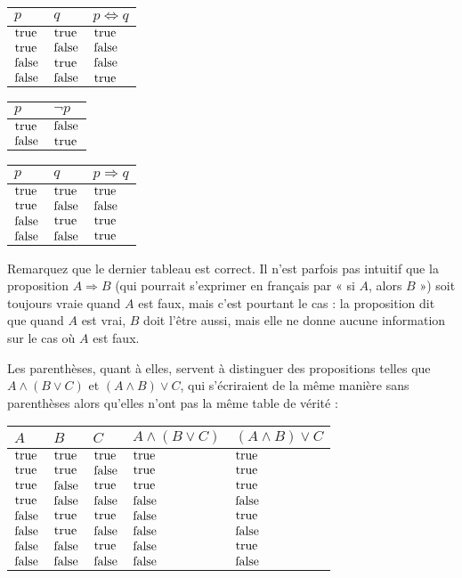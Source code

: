\begin{tabular}{ll|l}
  $p$ & $q$ & $p \Leftrightarrow q$ \\
  \hline

  $\mathrm{true}$ & $\mathrm{true}$ & $\mathrm{true}$ \\
  $\mathrm{true}$ & $\mathrm{false}$ & $\mathrm{false}$ \\
  $\mathrm{false}$ & $\mathrm{true}$ & $\mathrm{false}$ \\
  $\mathrm{false}$ & $\mathrm{false}$ & $\mathrm{true}$
\end{tabular}
\vspace{2 mm}

\begin{tabular}{l|l}
  $p$ & $\lnot p$ \\
  \hline

  $\mathrm{true}$ & $\mathrm{false}$ \\
  $\mathrm{false}$ & $\mathrm{true}$
\end{tabular}
\vspace{2 mm}

\begin{tabular}{ll|l}
  $p$ & $q$ & $p \Rightarrow q$ \\
  \hline

  $\mathrm{true}$ & $\mathrm{true}$ & $\mathrm{true}$ \\
  $\mathrm{true}$ & $\mathrm{false}$ & $\mathrm{false}$ \\
  $\mathrm{false}$ & $\mathrm{true}$ & $\mathrm{true}$ \\
  $\mathrm{false}$ & $\mathrm{false}$ & $\mathrm{true}$
\end{tabular}
\vspace{2 mm}

Remarquez que le dernier tableau est correct. Il n’est parfois pas intuitif
que la proposition $A \Rightarrow B$ (qui pourrait s’exprimer en français
par « si $A$, alors $B$ ») soit toujours vraie quand $A$ est faux, mais c’est
pourtant le cas : la proposition dit que quand $A$ est vrai, $B$ doit
l’être aussi, mais elle ne donne aucune information sur le cas où $A$ est
faux.

Les parenthèses, quant à elles, servent à distinguer des propositions telles
que $A \land (B \lor C)$ et $(A \land B) \lor C$, qui s’écriraient de la
même manière sans parenthèses alors qu’elles n’ont pas la même table de
vérité :

\begin{tabular}{lll|ll}
  $A$ & $B$ & $C$ & $A \land (B \lor C)$ & $(A \land B) \lor C$ \\
  \hline

  $\mathrm{true}$  & $\mathrm{true}$  & $\mathrm{true}$  & $\mathrm{true}$  & $\mathrm{true}$  \\
  $\mathrm{true}$  & $\mathrm{true}$  & $\mathrm{false}$ & $\mathrm{true}$  & $\mathrm{true}$  \\
  $\mathrm{true}$  & $\mathrm{false}$ & $\mathrm{true}$  & $\mathrm{true}$  & $\mathrm{true}$  \\
  $\mathrm{true}$  & $\mathrm{false}$ & $\mathrm{false}$ & $\mathrm{false}$ & $\mathrm{false}$ \\
  $\mathrm{false}$ & $\mathrm{true}$  & $\mathrm{true}$  & $\mathrm{false}$ & $\mathrm{true}$  \\
  $\mathrm{false}$ & $\mathrm{true}$  & $\mathrm{false}$ & $\mathrm{false}$ & $\mathrm{false}$ \\
  $\mathrm{false}$ & $\mathrm{false}$ & $\mathrm{true}$  & $\mathrm{false}$ & $\mathrm{true}$  \\
  $\mathrm{false}$ & $\mathrm{false}$ & $\mathrm{false}$ & $\mathrm{false}$ & $\mathrm{false}$
\end{tabular}

